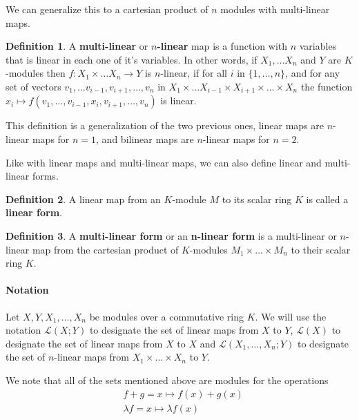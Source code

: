 \documentclass{report}
\theoremstyle{definition}
\newtheorem{defin}{Definition}
\theoremstyle{remark}
\begin{document}
We can generalize this to a cartesian product of $n$ modules with multi-linear maps. 

\begin{defin}
    A \textbf{multi-linear} or \textbf{$n$-linear} map is a function with $n$ variables that is linear in each one of it's variables. In other words, if  $X_1,\dots X_n $ and $Y$ are $K$-modules then $f: X_1 \times \dots X_n \longrightarrow Y$ is $n$-linear, if for all $i$ in $ \{1,\dots, n\}$, and for any set of vectors $v_1, \dots v_{i-1},v_{i+1},\dots, v_n$ in $X_1\times \dots X_{i-1} \times X_{i+1} \times \dots \times X_n$ the function $ x_i \mapsto f(v_1,\dots,v_{i-1},x_i,v_{i+1},\dots,v_n)$ is linear. 

\end{defin}

This definition is a generalization of the two previous ones, linear maps are $n$-linear maps for $n=1$, and bilinear maps are $n$-linear maps for $n = 2$.


Like with linear maps and multi-linear maps, we can also define linear and multi-linear forms. 

\begin{defin}
    A linear map from an $K$-module $M$ to its scalar ring $K$ is called a \textbf{linear form}.
\end{defin}


\begin{defin}
    A \textbf{multi-linear form} or an \textbf{n-linear form} is a multi-linear or $n$-linear map from the cartesian product of $K$-modules $M_1 \times \dots \times M_n$ to their scalar ring $K$.    
\end{defin}


\paragraph{Notation} Let $X,Y,X_1, \dots,X_n$ be modules over a commutative ring $K$. We will use the notation $\mathcal{L}(X; Y)$ to designate the set of linear maps from $X$ to $Y$, $\mathcal{L}(X)$ to designate the set of linear maps from $X$ to $X$ and $\mathcal{L}(X_1 , \dots , X_n ; Y)$ to designate the set of $n$-linear maps from $X_1 \times \dots \times X_n$ to $Y$.

We note that all of the sets mentioned above are modules for the operations 
\begin{equation*}
\begin{split}
    & f + g = x \mapsto f(x) + g(x) \\
    & \lambda f = x \mapsto \lambda f(x)
\end{split}
\end{equation*}
\end{document}
